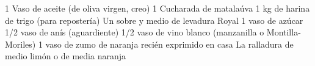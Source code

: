 1 Vaso de aceite (de oliva virgen, creo)
1 Cucharada de matalaúva
1 kg de harina de trigo (para repostería)
Un sobre y medio de levadura Royal
1 vaso de azúcar
1/2 vaso de anís (aguardiente)
1/2 vaso de vino blanco (manzanilla o Montilla-Moriles)
1 vaso de zumo de naranja recién exprimido en casa
La ralladura de medio limón o de media naranja
